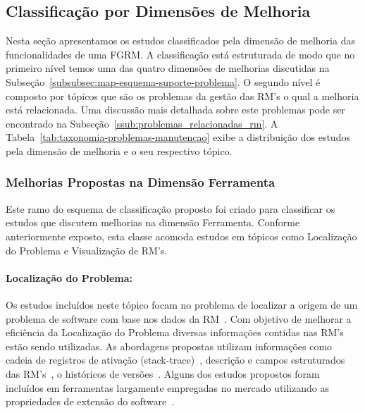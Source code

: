\subsection{Classificação por Dimensões de Melhoria}
\label{sub:extensões_para_problemas_na_manutenção_de_software}

Nesta seção apresentamos os estudos classificados pela dimensão de melhoria das
funcionalidades de uma FGRM\@. A classificação está estruturada de modo que no
primeiro nível temos uma das quatro dimensões de melhorias discutidas na
Subseção~\ref{subsubsec:map-esquema-suporte-problema}. O segundo nível é
composto por tópicos que são os problemas da gestão das RM's o qual a melhoria
está relacionada. Uma discussão mais detalhada sobre este problemas pode ser
encontrado na Subseção~\ref{ssub:problemas_relacionadas_rm}. A
Tabela~\ref{tab:taxonomia-problemas-manutencao} exibe a distribuição dos estudos
pela dimensão de melhoria e o seu respectivo tópico.




\subsubsection{Melhorias Propostas na Dimensão Ferramenta}
\label{ssub:melhorias_dim_ferramenta}

Este ramo do esquema de classificação proposto foi criado para classificar os
estudos que discutem melhorias na dimensão Ferramenta. Conforme anteriormente
exposto, esta classe acomoda estudos em tópicos como Localização do Problema e
Visualização de RM's.

\paragraph{Localização do Problema:} Os estudos incluídos neste tópico focam no
problema de localizar a origem de um problema de software com base nos dados da
RM~\cite{Hovemeyer:2004:FBE:1052883.1052895}. Com objetivo de melhorar a
eficiência da Localização do Problema diversas informações contidas nas RM's
estão sendo utilizadas. As abordagens propostas utilizam informações como cadeia
de registros de ativação (stack-trace)~\cite{Wong:2014:BBF:2705615.2706096},
des\-cri\-ção e campos estruturados das
RM's~\cite{Thung:2014:BIT:2635868.2661678}, o históricos de
versões~\cite{Bangcharoensap:2012:LSC:2419061.2419428,corley2011recovering,Romo:2015:TAT:2745802.2745833}.
Alguns dos estudos propostos foram incluídos em ferramentas largamente
empregadas no mercado utilizando as propriedades de extensão do
software~\cite{Thung:2014:BIT:2635868.2661678,corley2011recovering}.

